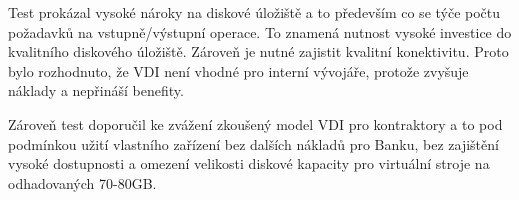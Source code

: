 Test prokázal vysoké nároky na diskové úložiště a to především co se týče počtu požadavků na vstupně/výstupní operace. To znamená nutnost vysoké investice do kvalitního diskového úložiště. Zároveň je nutné zajistit kvalitní konektivitu. Proto bylo rozhodnuto, že VDI není vhodné pro interní vývojáře, protože zvyšuje náklady a nepřináší benefity.

Zároveň test doporučil ke zvážení zkoušený model VDI pro kontraktory a to pod podmínkou užití vlastního zařízení bez dalších nákladů pro Banku, bez zajištění vysoké dostupnosti a omezení velikosti diskové kapacity pro virtuální stroje na odhadovaných 70-80GB.